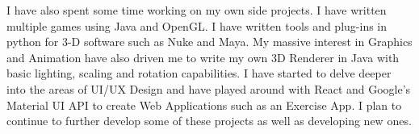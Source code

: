 \documentclass[11pt, a4paper]{awesome-cv}
\begin{document}
\begin{cvletter}
I have also spent some time working on my own side projects. I have written multiple games using Java and OpenGL. I have written tools and plug-ins in python for 3-D software such as Nuke and Maya. My massive interest in Graphics and Animation have also driven me to write my own 3D Renderer in Java with basic lighting, scaling and rotation capabilities. I have started to delve deeper into the areas of UI/UX Design and have played around with React and Google’s Material UI API to create Web Applications such as an Exercise App. I plan to continue to further develop some of these projects as well as developing new ones.
\end{cvletter}


\makeletterclosing
\end{document}
